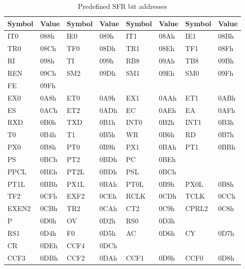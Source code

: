 \documentclass[a4paper,twoside,12pt]{book}
\newcommand{\mysmallfont}{\fontsize{8pt}{10pt} \selectfont{}}
\begin{document}
		\begin{table}[h!]
			\centering{}
			\mysmallfont{}
			\caption{Predefined SFR bit addresses}
			\begin{tabular}{|ll|ll|ll|ll|}
				\hline
				\textbf{Symbol}	& \textbf{Value}
					& \textbf{Symbol} & \textbf{Value}
					& \textbf{Symbol} & \textbf{Value}
					& \textbf{Symbol} & \textbf{Value} \\
				\hline
				IT0	& 088h	& IE0	& 089h	& IT1	& 08Ah	& IE1	& 08Bh \\
				TR0	& 08Ch	& TF0	& 08Dh	& TR1	& 08Eh	& TF1	& 08Fh \\
				RI	& 098h	& TI	& 099h	& RB8	& 09Ah	& TB8	& 09Bh \\
				REN	& 09Ch	& SM2	& 09Dh	& SM1	& 09Eh	& SM0	& 09Fh \\
				FE	& 09Fh	& 	& 	& 	& 	& 	&  \\
				EX0	& 0A8h	& ET0	& 0A9h	& EX1	& 0AAh	& ET1	& 0ABh \\
				ES	& 0ACh	& ET2	& 0ADh	& EC	& 0AEh	& EA	& 0AFh \\
				RXD	& 0B0h	& TXD	& 0B1h	& INT0	& 0B2h	& INT1	& 0B3h \\
				T0	& 0B4h	& T1	& 0B5h	& WR	& 0B6h	& RD	& 0B7h \\
				PX0	& 0B8h	& PT0	& 0B9h	& PX1	& 0BAh	& PT1	& 0BBh \\
				PS	& 0BCh	& PT2	& 0BDh	& PC	& 0BEh	& 	&  \\
				PPCL	& 0BEh	& PT2L	& 0BDh	& PSL	& 0BCh	& 	&  \\
				PT1L	& 0BBh	& PX1L	& 0BAh	& PT0L	& 0B9h	& PX0L	& 0B8h \\
				TF2	& 0CFh	& EXF2	& 0CEh	& RCLK	& 0CDh	& TCLK	& 0CCh \\
				EXEN2	& 0CBh	& TR2	& 0CAh	& CT2	& 0C9h	& CPRL2	& 0C8h \\
				P	& 0D0h	& OV	& 0D2h	& RS0	& 0D3h	& 	&  \\
				RS1	& 0D4h	& F0	& 0D5h	& AC	& 0D6h	& CY	& 0D7h \\
				CR	& 0DEh	& CCF4	& 0DCh	& 	& 	& 	&  \\
				CCF3	& 0DBh	& CCF2	& 0DAh	& CCF1	& 0D9h	& CCF0	& 0D8h \\
				\hline
			\end{tabular}
		\end{table}
\end{document}
